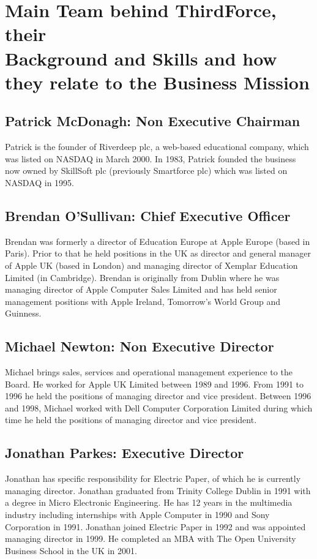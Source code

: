 \documentclass[a4paper,12pt]{article}
\begin{document}
\section*{Main Team behind ThirdForce, their \\ Background and Skills and how they
relate to the Business Mission}

\subsection*{Patrick McDonagh: Non Executive Chairman}

Patrick is the founder of Riverdeep plc, a web-based educational
company, which was listed on NASDAQ in March 2000. In 1983, Patrick
founded the business now owned by SkillSoft plc (previously Smartforce
plc) which was listed on NASDAQ in 1995.

\subsection*{Brendan O'Sullivan: Chief Executive Officer}

Brendan was formerly a director of Education Europe at Apple Europe
(based in Paris). Prior to that he held positions in the UK as director
and general manager of Apple UK (based in London) and managing director
of Xemplar Education Limited (in Cambridge). Brendan is originally from
Dublin where he was managing director of Apple Computer Sales Limited
and has held senior management positions with Apple Ireland, Tomorrow's
World Group and Guinness.

\subsection*{Michael Newton: Non Executive Director}

Michael brings sales, services and operational management experience to
the Board. He worked for Apple UK Limited between 1989 and 1996. From
1991 to 1996 he held the positions of managing director and vice
president. Between 1996 and 1998, Michael worked with Dell Computer
Corporation Limited during which time he held the positions of managing
director and vice president.

\subsection*{Jonathan Parkes: Executive Director}

Jonathan has specific responsibility for Electric Paper, of which he is
currently managing director. Jonathan graduated from Trinity College
Dublin in 1991 with a degree in Micro Electronic Engineering. He has 12
years in the multimedia industry including internships with Apple
Computer in 1990 and Sony Corporation in 1991. Jonathan joined Electric
Paper in 1992 and was appointed managing director in 1999. He completed
an MBA with The Open University Business School in the UK in 2001.
\end{document}
